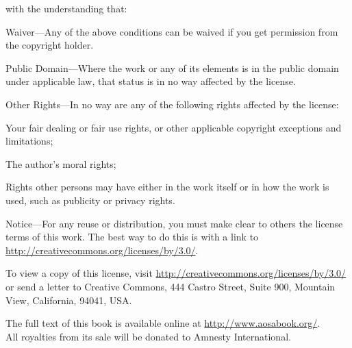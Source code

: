 \noindent
with the understanding that:

\begin{aosaitemize}

  \item Waiver---Any of the above conditions can be waived if you get
    permission from the copyright holder.

  \item Public Domain---Where the work or any of its elements is in
    the public domain under applicable law, that status is in no way
    affected by the license.

  \item Other Rights---In no way are any of the following rights
    affected by the license:
    \begin{aosaitemize}

      \item Your fair dealing or fair use rights, or other applicable
        copyright exceptions and limitations;

      \item The author's moral rights;

      \item Rights other persons may have either in the work itself or
        in how the work is used, such as publicity or privacy rights.

    \end{aosaitemize}

  \item Notice---For any reuse or distribution, you must make clear to
    others the license terms of this work. The best way to do this is
    with a link to \url{http://creativecommons.org/licenses/by/3.0/}.

\end{aosaitemize}

\noindent To view a copy of this license, visit
\url{http://creativecommons.org/licenses/by/3.0/} or send a letter to Creative
Commons, 444 Castro Street, Suite 900, Mountain View, California,
94041, USA.\\

\vspace{0.15cm}

\noindent
The full text of this book is available online at \url{http://www.aosabook.org/}.\\
All royalties from its sale will be donated to Amnesty International.\\

\vfill

